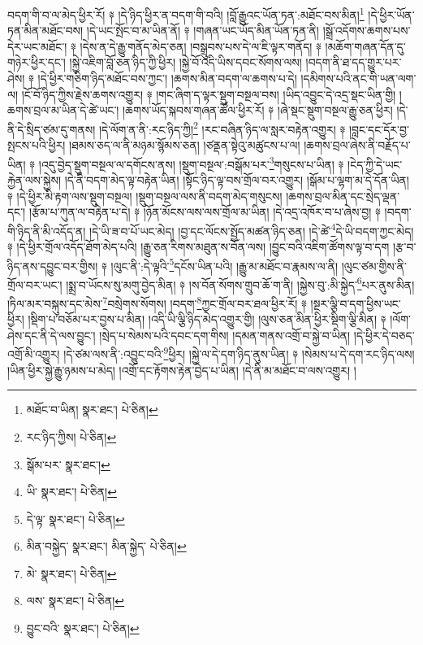 བདག་གི་བ་ལ་མེད་ཕྱིར་རོ། ༈ །དེ་ཉིད་ཕྱིར་ན་བདག་གི་བའི། །བློ་རྒྱུའང་ཡོན་ཏན་:མཐོང་བས་མིན།\footnote{མཐོང་བ་ཡིན།  སྣར་ཐང་།  པེ་ཅིན། } །དེ་ཕྱིར་ཡོན་ཏན་མིན་མཐོང་བས། །དེ་ཡང་སྤོང་བ་མ་ཡིན་ནོ། ༈ །གཞན་ཡང་ཡོད་མིན་ཡོན་ཏན་ནི། །སྒྲོ་འདོགས་ཆགས་པས་དེར་ཡང་མཐོང་། ༈ །དེས་ན་དེ་རྒྱུ་གནོད་མེད་ཅན། །བསྒྲུབས་པས་དེ་ལ་ཇི་ལྟར་གནོད། ༈ །མཆོག་གཞན་དོན་དུ་གཉེར་ཕྱིར་དང་། །སྐྱེ་འཇིག་བློ་ཅན་ཉིད་ཀྱི་ཕྱིར། །སྐྱེ་བོ་འདི་ཡིས་དབང་སོགས་ལས། །བདག་ནི་ཐ་དད་གྱུར་པར་ཤེས། ༈ །དེ་ཕྱིར་གཅིག་ཉིད་མཐོང་བས་ཀྱང་། །ཆགས་མིན་བདག་ལ་ཆགས་པ་དེ། །དམིགས་པའི་ནང་གི་ཡན་ལག་ལ། །ངོ་བོ་ཉིད་ཀྱིས་རྗེས་ཆགས་འགྱུར། ༈ །གང་ཞིག་ད་ལྟར་སྡུག་བསྔལ་བས། །ཡིད་འབྱུང་དེ་འདྲ་སྡང་ཡིན་གྱི། །ཆགས་བྲལ་མ་ཡིན་དེ་ཚེ་ཡང་། །ཆགས་ཡོད་སྐབས་གཞན་ཚོལ་ཕྱིར་རོ། ༈ །ཞེ་སྡང་སྡུག་བསྔལ་རྒྱུ་ཅན་ཕྱིར། །དེ་ནི་དེ་སྲིད་ཙམ་དུ་གནས། །དེ་ལོག་ན་ནི་:རང་ཉིད་ཀྱི།\footnote{རང་ཉིད་ཀྱིས།  པེ་ཅིན། } །རང་བཞིན་ཉིད་ལ་སླར་བརྟེན་འགྱུར། ༈ །བླང་དང་དོར་བྱ་སྤངས་པའི་ཕྱིར། །ཐམས་ཅད་ལ་ནི་མཉམ་སྙོམས་ཅན། །ཙནྡན་སྟེའུ་མཚུངས་པ་ལ། །ཆགས་བྲལ་ཞེས་ནི་བརྗོད་པ་ཡིན། ༈ །འདུ་བྱེད་སྡུག་བསྔལ་ལ་དགོངས་ནས། །སྡུག་བསྔལ་:བསྒོམ་པར་\footnote{སྒོམ་པར་  སྣར་ཐང་། }གསུངས་པ་ཡིན། ༈ །ངེད་ཀྱི་དེ་ཡང་རྐྱེན་ལས་སྐྱེས། །དེ་ནི་བདག་མེད་ལྟ་བརྟེན་ཡིན། །སྟོང་ཉིད་ལྟ་བས་གྲོལ་བར་འགྱུར། །སྒོམ་པ་ལྷག་མ་དེ་དོན་ཡིན། ༈ །དེ་ཕྱིར་མི་རྟག་ལས་སྡུག་བསྔལ། །སྡུག་བསྔལ་ལས་ནི་བདག་མེད་གསུངས། །ཆགས་བྲལ་མིན་དང་སྲེད་ལྡན་དང་། །རྩོམ་པ་ཀུན་ལ་བརྟེན་པ་དེ། ༈ །ཉོན་མོངས་ལས་ལས་གྲོལ་མ་ཡིན། །དེ་འདྲ་འཁོར་བ་པ་ཞེས་བྱ། ༈ །བདག་གི་ཉིད་ནི་མི་འདོད་ན། །དེ་ཡི་ཟ་བ་པོ་ཡང་མེད། །བྱ་དང་ལོངས་སྤྱོད་མཚན་ཉིད་ཅན། །དེ་ཚེ་\footnote{ཡི་  སྣར་ཐང་།  པེ་ཅིན། }དེ་ཡི་བདག་ཀྱང་མེད། ༈ །དེ་ཕྱིར་གྲོལ་འདོད་ཐོག་མེད་པའི། །རྒྱུ་ཅན་རིགས་མཐུན་ས་བོན་ལས། །བྱུང་བའི་འཇིག་ཚོགས་ལྟ་བ་དག །རྩ་བ་ཉིད་ནས་དབྱུང་བར་གྱིས། ༈ །ལུང་ནི་:དེ་ལྟའི་\footnote{དེ་ལྟ་  སྣར་ཐང་།  པེ་ཅིན། }དངོས་ཡིན་པའི། །རྒྱུ་མ་མཐོང་བ་རྣམས་ལ་ནི། །ལུང་ཙམ་གྱིས་ནི་གྲོལ་བར་ཡང་། །སྨྲ་བ་ཡོངས་སུ་མགུ་བྱེད་མིན། ༈ །ས་བོན་སོགས་གྲུབ་ཆོ་ག་ནི། །སྐྱེས་བུ་:མི་སྐྱེད་\footnote{མིན་བསྐྱེད་  སྣར་ཐང་། མིན་སྐྱེད་  པེ་ཅིན། }པར་ནུས་མིན། །ཏིལ་མར་བསྐུས་དང་མེས་\footnote{མེ་  སྣར་ཐང་།  པེ་ཅིན། }བསྲེགས་སོགས། །བདག་\footnote{ལས་  སྣར་ཐང་།  པེ་ཅིན། }ཀྱང་གྲོལ་བར་ཐལ་ཕྱིར་རོ། ༈ །སྔར་ལྕི་བ་དག་ཕྱིས་ཡང་ཕྱིར། །སྡིག་པ་བཅོམ་པར་བྱས་པ་མིན། །འདི་ཡི་ལྕི་ཉིད་མེད་འགྱུར་གྱི། །ལུས་ཅན་མིན་ཕྱིར་སྡིག་ལྕི་མིན། ༈ །ལོག་ཤེས་དང་ནི་དེ་ལས་བྱུང་། །སྲེད་པ་སེམས་པའི་དབང་དག་གིས། །དམན་གནས་འགྲོ་བ་སྐྱེ་བ་ཡིན། །དེ་ཕྱིར་དེ་བཅད་འགྲོ་མི་འགྱུར། །དེ་ཙམ་ལས་ནི་:འབྱུང་བའི་\footnote{བྱུང་བའི་  སྣར་ཐང་།  པེ་ཅིན། }ཕྱིར། །སྐྱེ་ལ་དེ་དག་ཉིད་ནུས་ཡིན། ༈ །སེམས་པ་དེ་དག་རང་ཉིད་ལས། །ཡིན་ཕྱིར་སྐྱེ་རྒྱུ་ཉམས་པ་མེད། །འགྲོ་དང་རྟོགས་རྟེན་བྱེད་པ་ཡིན། །དེ་ནི་མ་མཐོང་བ་ལས་འགྱུར། །
